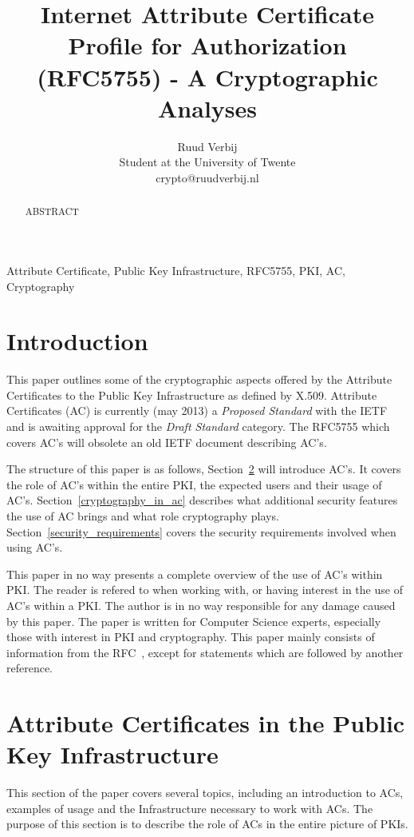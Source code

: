 \documentclass[10pt,conference,a4paper]{IEEEtran}
\title{Internet Attribute Certificate Profile for Authorization (RFC5755) - A Cryptographic Analyses}
\author{Ruud Verbij \\ Student at the University of Twente \\ crypto@ruudverbij.nl}
\begin{document}
\maketitle

\begin{abstract}
ABSTRACT
\end{abstract}

\begin{IEEEkeywords}
Attribute Certificate, Public Key Infrastructure, RFC5755, PKI, AC, Cryptography
\end{IEEEkeywords}

\section{Introduction}
\label{Introduction}
This paper outlines some of the cryptographic aspects offered by the Attribute Certificates\cite{rfc_ac} to the Public Key Infrastructure as defined by X.509\cite{rfc_x509}. Attribute Certificates (AC) is currently (may 2013) a \textit{Proposed Standard} with the IETF and is awaiting approval for the \textit{Draft Standard} category. The RFC5755 which covers AC's will obsolete an old IETF document describing AC's\cite{rfc_oldac}.

The structure of this paper is as follows, Section~\ref{ac_in_pki} will introduce AC's. It covers the role of AC's within the entire PKI, the expected users and their usage of AC's. Section~\ref{cryptography_in_ac} describes what additional security features the use of AC brings and what role cryptography plays. Section~\ref{security_requirements} covers the security requirements involved when using AC's.  

This paper in no way presents a complete overview of the use of AC's within PKI. The reader is refered to \cite{rfc_ac} when working with, or having interest in the use of AC's within a PKI. The author is in no way responsible for any damage caused by this paper. The paper is written for Computer Science experts, especially those with interest in PKI and cryptography. This paper mainly consists of information from the RFC~\cite{rfc_ac}, except for statements which are followed by another reference.

\section{Attribute Certificates in the Public Key Infrastructure}
\label{ac_in_pki}
This section of the paper covers several topics, including an introduction to ACs, examples of usage and the Infrastructure necessary to work with  ACs. The purpose of this section is to describe the role of ACs in the entire picture of PKIs.
\end{document}
